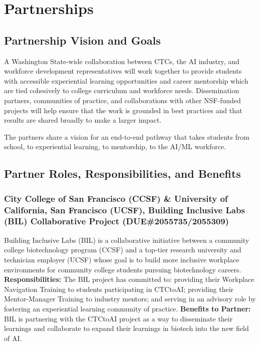 \section{Partnerships}



\subsection{Partnership Vision and Goals}

A Washington State-wide collaboration between CTCs, the AI industry, and workforce development representatives will work together to provide students with accessible experiential learning opportunities and career mentorship which are tied cohesively to college curriculum and workforce needs. Dissemination partners, communities of practice, and collaborations with other NSF-funded projects will help ensure that the work is grounded in best practices and that results are shared broadly to make a larger impact.

The partners share a vision for an end-to-end pathway that takes students from school, to experiential learning, to mentorship, to the AI/ML workforce.

\subsection{Partner Roles, Responsibilities, and Benefits}

\subsubsection{City College of San Francisco (CCSF) \& University of California, San Francisco (UCSF), Building Inclusive Labs (BIL) Collaborative Project (DUE\#2055735/2055309)}

Building Inclusive Labs (BIL) is a collaborative initiative between a community college biotechnology program (CCSF) and a top-tier research university and technician employer (UCSF) whose goal is to build more inclusive workplace environments for community college students pursuing biotechnology careers. \textbf{Responsibilities:} The BIL project has committed to: providing their Workplace Navigation Training to students participating in CTCtoAI; providing their Mentor-Manager Training to industry mentors; and serving in an advisory role by fostering an experiential learning community of practice. \textbf{Benefits to Partner:} BIL is partnering with the CTCtoAI project as a way to disseminate their learnings and collaborate to expand their learnings in biotech into the new field of AI.


